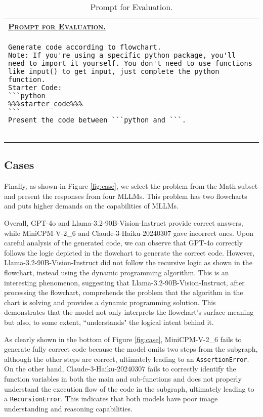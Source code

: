 \begin{table*}[htbp]
\centering
\captionsetup{justification=centering}
\begin{tabular}{p{\textwidth}}
\toprule
\underline{\textbf{\textsc{Prompt for Evaluation.}}} \\
\begin{minipage}{\textwidth}
\vspace{2mm}
\begin{verbatim}
Generate code according to flowchart.
Note: If you're using a specific python package, you'll need to import it yourself. You don't need to use functions like input() to get input, just complete the python function.
Starter Code:
```python
%%%starter_code%%%
```
Present the code between ```python and ```.


\end{verbatim}
\end{minipage} \\
\bottomrule
\end{tabular}

\caption{Prompt for Evaluation.}
\label{tab:evaluation}
\end{table*}


\subsection{Cases}
\label{sec:cases}
Finally, as shown in Figure \ref{fig:case}, we select the problem from the Math subset and present the responses from four MLLMs. This problem has two flowcharts and puts higher demands on the capabilities of MLLMs.

Overall, GPT-4o and Llama-3.2-90B-Vision-Instruct provide correct answers, while MiniCPM-V-2\_6 and Claude-3-Haiku-20240307 gave incorrect ones. Upon careful analysis of the generated code, we can observe that GPT-4o correctly follows the logic depicted in the flowchart to generate the correct code. However, Llama-3.2-90B-Vision-Instruct did not follow the recursive logic as shown in the flowchart, instead using the dynamic programming algorithm. This is an interesting phenomenon, suggesting that Llama-3.2-90B-Vision-Instruct, after processing the flowchart, comprehends the problem that the algorithm in the chart is solving and provides a dynamic programming solution. This demonstrates that the model not only interprets the flowchart's surface meaning but also, to some extent, ``understands" the logical intent behind it.

As clearly shown in the bottom of Figure \ref{fig:case}, MiniCPM-V-2\_6 fails to generate fully correct code because the model omits two steps from the subgraph, although the other steps are correct, ultimately leading to an \texttt{AssertionError}. On the other hand, Claude-3-Haiku-20240307 fails to correctly identify the function variables in both the main and sub-functions and does not properly understand the execution flow of the code in the subgraph, ultimately leading to a \texttt{RecursionError}. This indicates that both models have poor image understanding and reasoning capabilities.
